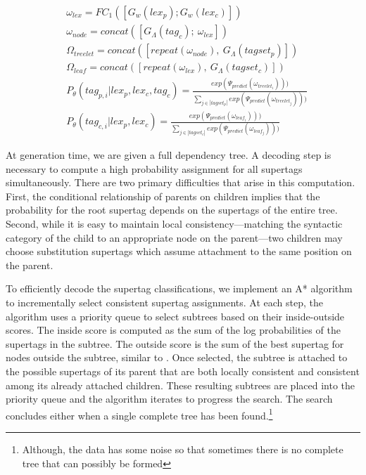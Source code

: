 \documentclass[11pt]{article}
\begin{document}
\begin{align}
&\omega_{lex} = FC_1([G_w(lex_p); G_w(lex_c)]) \label{eq:fergusn} \\
&\omega_{node}=concat([G_\Lambda(tag_c);~\omega_{lex}]) \nonumber \\
&\Omega_{treelet} = concat([repeat(\omega_{node}),~G_\Lambda(tagset_p)]) \nonumber \\
&\Omega_{leaf} = concat([repeat(\omega_{lex}),~G_\Lambda(tagset_c)]) \nonumber \\
&P_\theta(tag_{p,i} | lex_{p}, lex_{c}, tag_{c})=
\frac{exp(\Psi_{predict}(\omega_{treelet_i})))}
{\sum_{j \in |tagset_p|} exp(\Psi_{predict}(\omega_{treelet_j})))} \nonumber \\
&P_\theta(tag_{c,i} |lex_{p}, lex_{c}) = 
\frac{exp(\Psi_{predict}(\omega_{leaf_i})))}
{\sum_{j \in |tagset_c|} exp(\Psi_{predict}(\omega_{leaf_j})))} \nonumber 
\end{align}


At generation time, we are given a full dependency tree.  A decoding
step is necessary to compute a high probability
assignment for all supertags simultaneously.
%
There are two primary difficulties that arise in this computation.
%
First, the conditional relationship of parents on children implies that the probability for the root supertag depends on the supertags of the entire tree.
%
Second, while it is easy to maintain local consistency---matching the syntactic
category of the child to an appropriate node on the parent---two children may choose substitution supertags which assume attachment to the same position on the parent.

To efficiently decode the supertag classifications, we implement an A* algorithm to incrementally select consistent supertag assignments.
%
At each step, the algorithm uses a priority queue to select subtrees based on their inside-outside scores.
%
The inside score is computed as the sum of the log probabilities of the supertags in the subtree.
%
The outside score is the sum of the best supertag for nodes outside the subtree, similar to .
%
Once selected, the subtree is attached to the possible supertags of its parent that are both locally consistent and consistent among its already attached children.
%
These resulting subtrees are placed into the priority queue and the algorithm iterates to progress the search.
%
The search concludes either when a single complete tree has been found.\footnote{Although, the data has some noise so that sometimes there is no complete tree that can possibly be formed}
\end{document}
